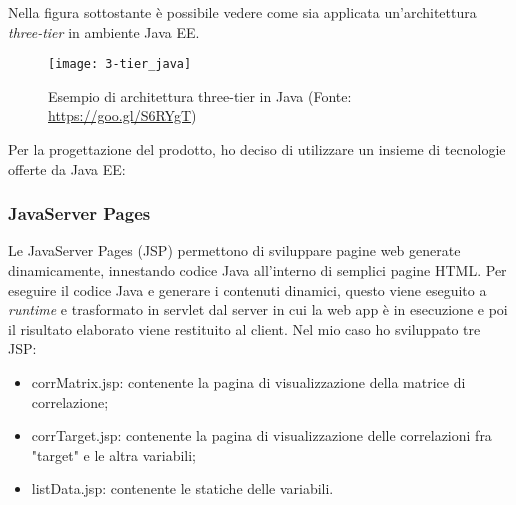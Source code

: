 Nella figura sottostante è possibile vedere come sia applicata un'architettura \textit{three-tier} in ambiente Java EE.
\begin{figure}[!h]
	\centering
	\texttt{[image: 3-tier\_java]}
	\caption{Esempio di architettura three-tier in Java (Fonte: \href{https://goo.gl/S6RYgT}{https://goo.gl/S6RYgT})}
\end{figure}

Per la progettazione del prodotto, ho deciso di utilizzare un insieme di tecnologie offerte da Java EE:
\subsubsection{JavaServer Pages}
Le JavaServer Pages (JSP) permettono di sviluppare pagine web generate dinamicamente, innestando codice Java all'interno di semplici pagine HTML. Per eseguire il codice Java e generare i contenuti dinamici, questo viene eseguito a \textit{runtime} e trasformato in servlet dal server in cui la \gls{web app} è in esecuzione e poi il risultato elaborato viene restituito al client.
Nel mio caso ho sviluppato tre JSP:
\begin{itemize}
	\item corrMatrix.jsp: contenente la pagina di visualizzazione della matrice di correlazione;
	\item corrTarget.jsp: contenente la pagina di visualizzazione delle correlazioni fra "target" e le altra variabili;
	\item listData.jsp: contenente le statiche delle variabili.
\end{itemize}

